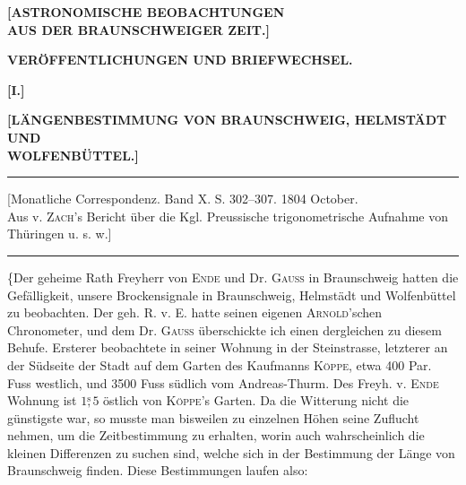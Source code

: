 \clearpage\begingroup\NoSourceHead{}
\def\Bsec#1#2{#1\mathord{\overset{\mathrm{s}}{,}}#2}
\def\Barc#1#2{#1\mathord{\overset{\prime\prime}{,}}#2}
\begin{center}
{\Large\bfseries [ASTRONOMISCHE BEOBACHTUNGEN\\AUS DER BRAUNSCHWEIGER ZEIT.]}\par\medskip
{\large\bfseries VERÖFFENTLICHUNGEN UND BRIEFWECHSEL.}\par\medskip
\textbf{[I.]}\par\smallskip
\textbf{[LÄNGENBESTIMMUNG VON BRAUNSCHWEIG, HELMSTÄDT UND\\WOLFENBÜTTEL.]}
\end{center}
\noindent\rule{\linewidth}{.35pt}
\begin{center}\small
[Monatliche Correspondenz. Band X. S. 302--307. 1804 October.\\
Aus v. \textsc{Zach}'s Bericht über die Kgl. Preussische trigonometrische Aufnahme von Thüringen u. s. w.]
\end{center}
\noindent\rule{\linewidth}{.35pt}
\begin{center}\end{center}
\noindent\hspace*{\parindent}\{Der geheime Rath Freyherr von \textsc{Ende} und Dr. \textsc{Gauss} in Braunschweig hatten die Gefälligkeit, unsere Brockensignale in Braunschweig, Helmstädt und Wolfenbüttel zu beobachten. Der geh. R. v. E. hatte seinen eigenen \textsc{Arnold}'schen Chronometer, und dem Dr. \textsc{Gauss} überschickte ich einen dergleichen zu diesem Behufe. Ersterer beobachtete in seiner Wohnung in der Steinstrasse, letzterer an der Südseite der Stadt auf dem Garten des Kaufmanns \textsc{Köppe}, etwa 400 Par. Fuss westlich, und 3500 Fuss südlich vom Andreas-Thurm. Des Freyh. v. \textsc{Ende} Wohnung ist $\Bsec15$ östlich von \textsc{Köppe}'s Garten. Da die Witterung nicht die günstigste war, so musste man bisweilen zu einzelnen Höhen seine Zuflucht nehmen, um die Zeitbestimmung zu erhalten, worin auch wahrscheinlich die kleinen Differenzen zu suchen sind, welche sich in der Bestimmung der Länge von Braunschweig finden. Diese Bestimmungen laufen also:
\clearpage{}
